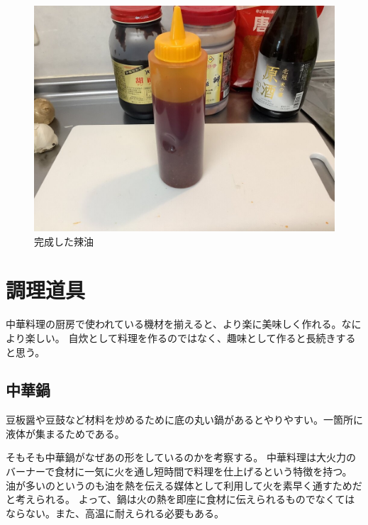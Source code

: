\documentclass[a4paper,10pt,xelatex,ja=standard,twocolumn]{bxjsarticle}
\begin{document}
\begin{figure}[h]
  \caption{完成した辣油}
  \label{rayu3}
  \begin{center}
    \includegraphics[width=\linewidth]{IMG_4090.jpg}
  \end{center}
\end{figure}

\section{調理道具}

中華料理の厨房で使われている機材を揃えると、より楽に美味しく作れる。なにより楽しい。
自炊として料理を作るのではなく、趣味として作ると長続きすると思う。

\subsection{中華鍋}

豆板醤や豆鼓など材料を炒めるために底の丸い鍋があるとやりやすい。一箇所に液体が集まるためである。

そもそも中華鍋がなぜあの形をしているのかを考察する。
中華料理は大火力のバーナーで食材に一気に火を通し短時間で料理を仕上げるという特徴を持つ。
油が多いのというのも油を熱を伝える媒体として利用して火を素早く通すためだと考えられる。
よって、鍋は火の熱を即座に食材に伝えられるものでなくてはならない。また、高温に耐えられる必要もある。
\end{document}
